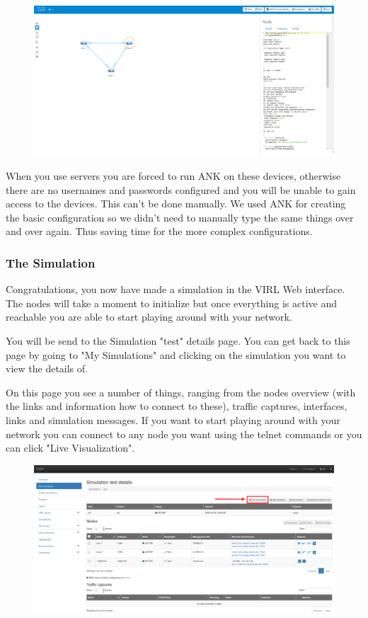 \documentclass{article}
\begin{document}
\begin{figure}[H]
	\centering
	\includegraphics[width=\textwidth]{images/ANK_Config.png}
\end{figure}

When you use servers you are forced to run ANK on these devices, otherwise there are no usernames and passwords configured and you will be unable to gain access to the devices.
This can't be done manually.
We used ANK for creating the basic configuration so we didn't need to manually type the same things over and over again.
Thus saving time for the more complex configurations.

\subsubsection{The Simulation}
Congratulations, you now have made a simulation in the VIRL Web interface.
The nodes will take a moment to initialize but once everything is active and reachable you are able to start playing around with your network.

You will be send to the Simulation "test" details page.
You can get back to this page by going to "My Simulations" and clicking on the simulation you want to view the details of.

On this page you see a number of things, ranging from the nodes overview (with the links and information how to connect to these), traffic captures, interfaces, links and simulation messages.
If you want to start playing around with your network you can connect to any node you want using the telnet commands or you can click "Live Visualization".

\begin{figure}[H]
	\centering
	\includegraphics[width=\textwidth]{images/Live_visualization.png}
\end{figure}
\end{document}
